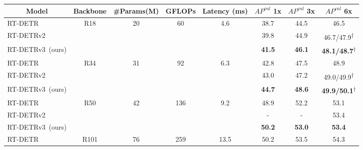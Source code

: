 \documentclass[10pt,twocolumn,letterpaper]{article}
\begin{document}
\begin{table}[]
\centering
\setlength{\tabcolsep}{7.5pt} %
\renewcommand{\arraystretch}{1.3}
\begin{tabular}{l|c|c|c|c|ccc}
\hline
\multicolumn{1}{c|}{Model}               & Backbone & \#Params(M) & GFLOPs & Latency (ms)  & $AP^{val}$ 1x & $AP^{val}$ 3x & $AP^{val}$ 6x \\ \hline
RT-DETR~\cite{zhao2024rt-detr}           & \multirow{3}{*}{R18}         & \multirow{3}{*}{20}            & \multirow{3}{*}{60}      & \multirow{3}{*}{4.6}          & 38.7          & 44.5          & 46.5          \\
RT-DETRv2~\cite{lv2024rt-detrv2}         &      &           &      &       & 39.8          & 44.9          & 46.7/47.9\textsuperscript{$\dagger$}          \\
\rowcolor[HTML]{ECF4FF} RT-DETRv3~(ours) &          &             &        &           & \textbf{41.5} & \textbf{46.1} & \textbf{48.1/48.7\textsuperscript{$\dagger$}} \\ \hline
RT-DETR~\cite{zhao2024rt-detr}          & \multirow{3}{*}{R34}         & \multirow{3}{*}{31}            & \multirow{3}{*}{92}      & \multirow{3}{*}{6.3}           & 42.8          & 47.5          & 48.9          \\
RT-DETRv2~\cite{lv2024rt-detrv2}         &       &           &      &       & 43.0          & 47.2          & 49.0/49.9\textsuperscript{$\dagger$}          \\
\rowcolor[HTML]{ECF4FF} RT-DETRv3~(ours) &          &             &        &           & \textbf{44.7} & \textbf{48.6} & \textbf{49.9/50.1\textsuperscript{$\dagger$}} \\ \hline
RT-DETR~\cite{zhao2024rt-detr}           & \multirow{3}{*}{R50}         & \multirow{3}{*}{42}            & \multirow{3}{*}{136}      & \multirow{3}{*}{9.2}           & 48.9          & 52.2          & 53.1          \\
RT-DETRv2~\cite{lv2024rt-detrv2}         &       &           &     &        & -             & -             & 53.4          \\
\rowcolor[HTML]{ECF4FF} RT-DETRv3~(ours) &          &             &        &           & \textbf{50.2} & \textbf{53.0}   & \textbf{53.4} \\ \hline
RT-DETR~\cite{zhao2024rt-detr}          & \multirow{3}{*}{R101}         & \multirow{3}{*}{76}            & \multirow{3}{*}{259}      & \multirow{3}{*}{13.5}           & 50.2          & 53.5          & 54.3          \\

\end{tabular}
\end{table}
\end{document}
